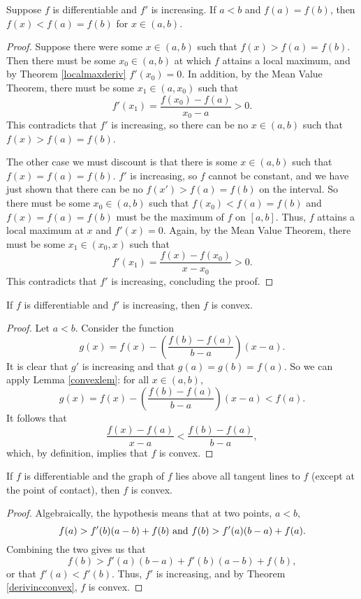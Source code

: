 \begin{lemma} \label{convexlem}
Suppose $f$ is differentiable and $f'$ is increasing. If $a < b$ and $f(a) = f(b)$, then $f(x) < f(a)=f(b)$ for $x \in (a, b)$. 

\begin{proof}
Suppose there were some $x \in (a, b)$ such that $f(x) > f(a)=f(b)$. Then there must be some $x_0 \in (a, b)$ at which $f$ attains a local maximum, and by Theorem \ref{localmaxderiv} $f'(x_0) = 0$. In addition, by the Mean Value Theorem, there must be some $x_1 \in (a, x_0)$ such that 
\[ f'(x_1) = \frac{f(x_0)-f(a)}{x_0-a} > 0. \]
This contradicts that $f'$ is increasing, so there can be no $x \in (a, b)$ such that $f(x)>f(a)=f(b)$.

The other case we must discount is that there is some $x \in (a, b)$ such that $f(x)=f(a)=f(b)$. $f'$ is increasing, so $f$ cannot be constant, and we have just shown that there can be no $f(x') > f(a) = f(b)$ on the interval. So there must be some $x_0 \in (a, b)$ such that $f(x_0) < f(a) = f(b)$ and $f(x)=f(a)=f(b)$ must be the maximum of $f$ on $[a, b]$. Thus, $f$ attains a local maximum at $x$ and $f'(x) = 0$. Again, by the Mean Value Theorem, there must be some $x_1 \in (x_0, x)$ such that
\[ f'(x_1) = \frac{f(x)-f(x_0)}{x-x_0} > 0. \]
This contradicts that $f'$ is increasing, concluding the proof.
\end{proof}
\end{lemma}

\begin{theorem} \label{derivincconvex}
If $f$ is differentiable and $f'$ is increasing, then $f$ is convex.

\begin{proof}
Let $a < b$. Consider the function
\[ g(x) = f(x) - \left(\frac{f(b)-f(a)}{b-a}\right)(x-a). \]
It is clear that $g'$ is increasing and that $g(a)=g(b)=f(a)$. So we can apply Lemma \ref{convexlem}: for all $x \in (a, b)$,
\[ g(x) = f(x) - \left(\frac{f(b)-f(a)}{b-a}\right)(x-a) < f(a). \]
It follows that
\[ \frac{f(x)-f(a)}{x-a} < \frac{f(b)-f(a)}{b-a}, \]
which, by definition, implies that $f$ is convex.
\end{proof}
\end{theorem}

\begin{theorem}
If $f$ is differentiable and the graph of $f$ lies above all tangent lines to $f$ (except at the point of contact), then $f$ is convex.

\begin{proof}
Algebraically, the hypothesis means that at two points, $a < b$,
\[ f(a) > f'(b)(a-b) + f(b)\ \textrm{and}\ f(b) > f'(a)(b-a) + f(a). \]
Combining the two gives us that
\[ f(b) > f'(a)(b-a) + f'(b)(a-b) + f(b), \]
or that $f'(a) < f'(b)$. Thus, $f'$ is increasing, and by Theorem \ref{derivincconvex}, $f$ is convex.
\end{proof}
\end{theorem}




